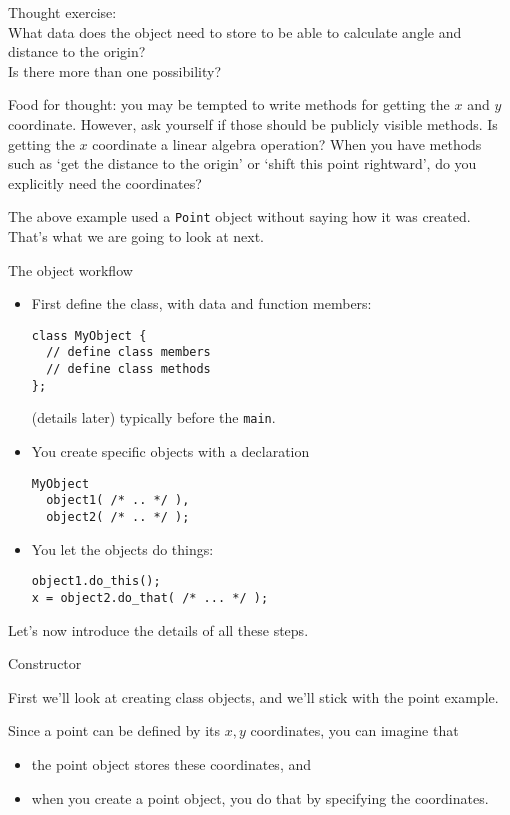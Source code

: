 \begin{exercise}
  \label{ex:pointdesign}
  Thought exercise:\\
  What data does the object need to store to be able to calculate
  angle and distance to the origin?\\
  Is there more than one possibility?
\end{exercise}

Food for thought: you may be tempted  to  write methods for getting the $x$ and $y$
coordinate. However, ask yourself if those should be publicly visible methods.
Is getting the $x$ coordinate a linear algebra operation? When you have methods
such as `get the distance to the origin' or `shift this point rightward',
do you explicitly need the coordinates?

The above example used a \lstinline{Point} object without saying
how it was created.
That's what we are going to look at next.

\begin{block}{The object workflow}
  \label{sl:object-flow}
  \begin{itemize}
  \item First define the class, with data and function members:
\begin{lstlisting}
class MyObject {
  // define class members
  // define class methods
};
\end{lstlisting}
(details later)
typically before the \lstinline{main}.
  \item You create specific objects with a declaration
\begin{lstlisting}
MyObject
  object1( /* .. */ ),
  object2( /* .. */ );    
\end{lstlisting}
  \item You let the objects do things:
\begin{lstlisting}
object1.do_this();
x = object2.do_that( /* ... */ );
\end{lstlisting}
  \end{itemize}
\end{block}

Let's now introduce the details of all these steps.

 {Constructor}
\label{sec:simple-constructor}

First we'll look at creating class objects,
and we'll stick with the point example.

Since a point can be defined by its $x,y$ coordinates,
you can imagine that
\begin{itemize}
\item
  the point object stores these coordinates, and
\item when you create a point object, you do that by
  specifying the coordinates.
\end{itemize}

